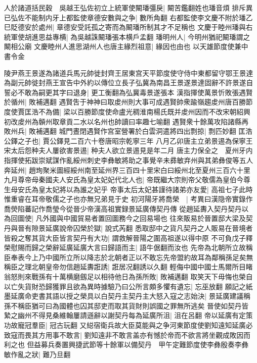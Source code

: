 人於諸道括民穀　吳越王弘佐初立上統軍使闞璠彊戾|{
	闞苦鑑翻姓也璠音煩}
排斥異已弘佐不能制内牙上都監使章德安數與之争|{
	數所角翻}
右都監使李文慶不附於璠乙巳貶德安於處州|{
	章德安受託孤之寄而為闞璠所制其才不足稱也}
文慶于睦州璠與右統軍使胡進思益專横|{
	為吳越誅闞璠張本横戶孟翻}
璠明州人|{
	今明州猶祀闞璠謂之闞相公廟}
文慶睦州人進思湖州人也唐主緣烈祖意|{
	緣因也由也}
以天雄節度使兼中書令金

陵尹燕王景遂為諸道兵馬元帥徙封齊王居東宫天平節度使守侍中東都留守鄂王景達為副元帥徙封燕王宣告中外約以傳位立長子弘冀為南昌王景遂景達固辭不許景遂自誓必不敢為嗣更其字曰退身|{
	更工衡翻為弘冀毒景遂張本}
漢指揮使萬景忻敗張遇賢於循州|{
	敗補邁翻}
遇賢吿于神神曰取䖍州則大事可成遇賢帥衆踰嶺趨䖍州唐百勝節度使賈匡浩不為備|{
	梁以百勝節度使命盧光稠淮南楊氏既并䖍州因而不改宋朝紹興初改䖍州為贑州取章貢二水以名州也帥讀曰率趣七喻翻}
遇賢衆十餘萬攻陷諸縣再敗州兵|{
	敗補邁翻}
城門晝閉遇賢作宫室營署於白雲洞遣將四出剽掠|{
	剽匹妙翻}
匡浩公鐸之子也|{
	賈公鐸見二百六十卷唐昭宗乾寧三年}
八月乙卯唐主立弟景逷為保寧王宋太后怨种夫人屢欲害景逷|{
	种夫人欲立景逷見是年二月}
唐主力保全之　夏州牙内指揮使拓跋崇斌謀作亂綏州刺史李彝敏將助之事覺辛未彞敏弃州與其弟彝俊等五人奔延州|{
	趙珣聚米圖經綏州南至延州界三百四十里宋白曰綏州北至夏州三百六十里}
九月尊帝母秦國夫人安氏為皇太妃妃代北人也|{
	帝既繼大宗則帝父敬儒為皇伯今尊生母安氏為皇太妃將以為誰之妃乎}
帝事太后太妃甚謹待諸弟亦友愛|{
	高祖七子此時惟重睿在耳帝敬儒之子也亦無兄弟見于史}
初河陽牙將喬榮　|{
	考異曰漢隐帝實錄作喬熒陷蕃記作喬瑩今從晉少帝漢高祖實録景延廣傳契丹傳}
從趙延夀入契丹契丹以為回圖使|{
	凡外國與中國貿易者置回圖務今之回易場也}
往來販易於晉置邸大梁及契丹與晉有隙景延廣說帝囚榮於獄|{
	說式芮翻}
悉取邸中之貨凡契丹之人販易在晉境者皆殺之奪其貨大臣皆言契丹有大功|{
	謂救解晉陽之圍高祖遂以得中原}
不可負戊子釋榮慰賜而歸之榮辭延廣延廣大言曰歸語而主|{
	語牛倨翻而汝也}
先帝為北朝所立故稱臣奉表今上乃中國所立所以降志於北朝者正以不敢忘先帝盟約故耳為鄰稱孫足矣無稱臣之理北朝皇帝勿信趙延夀誑誘|{
	誑居况翻誘以久翻}
輕侮中國中國士馬爾所目睹翁怒則來戰孫有十萬横磨劔足以相待他日為孫所敗|{
	敗補邁翻}
取笑天下毋悔也榮自以亡失貨財恐歸獲罪且欲為異時據驗乃曰公所言頗多懼有遺忘|{
	忘巫放翻}
願記之紙墨延廣命吏書其語以授之榮具以白契丹主契丹主大怒入寇之志始決|{
	景延廣建議稱孫不稱臣猶可曰為國體也囚其邸吏而取其貨財則誤國之罪無所逃矣}
晉使如契丹皆縶之幽州不得見桑維翰屢請遜辭以謝契丹每為延廣所沮|{
	沮在呂翻}
帝以延廣有定策功故寵冠羣臣|{
	冠古玩翻}
又縂宿衛兵故大臣莫能與之争河東節度使劉知遠知延廣必致寇而畏其方用事不敢言|{
	劉知遠非不敢言盖亦有憾於帝而不欲言將坐觀成敗因而利之也}
但益募兵奏置興捷武節等十餘軍以備契丹　甲午定難節度使李彝殷奏李彝敏作亂之狀|{
	難乃旦翻}
